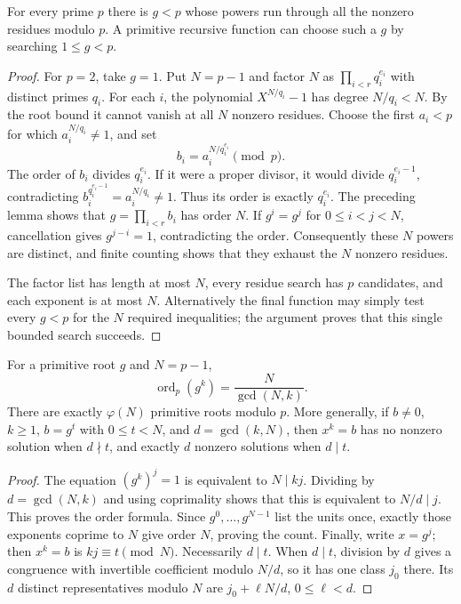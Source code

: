\begin{theorem}\label{qr:primitive}
For every prime $p$ there is $g<p$ whose powers run through all the
nonzero residues modulo $p$. A primitive recursive function can choose
such a $g$ by searching $1\le g<p$.
\end{theorem}
\begin{proof}
For $p=2$, take $g=1$. Put $N=p-1$ and factor $N$ as
$\prod_{i<r}q_i^{e_i}$ with distinct primes $q_i$. For each $i$, the
polynomial $X^{N/q_i}-1$ has degree $N/q_i<N$. By the root bound it
cannot vanish at all $N$ nonzero residues. Choose the first $a_i<p$
for which $a_i^{N/q_i}\ne1$, and set
\[
 b_i=a_i^{N/q_i^{e_i}}\pmod p.
\]
The order of $b_i$ divides $q_i^{e_i}$. If it were a proper divisor,
it would divide $q_i^{e_i-1}$, contradicting
$b_i^{q_i^{e_i-1}}=a_i^{N/q_i}\ne1$. Thus its order is exactly
$q_i^{e_i}$. The preceding lemma shows that $g=\prod_{i<r}b_i$
has order $N$. If $g^i=g^j$ for $0\le i<j<N$, cancellation gives
$g^{j-i}=1$, contradicting the order. Consequently these $N$ powers
are distinct, and finite counting shows that they exhaust the $N$
nonzero residues.

The factor list has length at most $N$, every residue search has $p$
candidates, and each exponent is at most $N$. Alternatively the final
function may simply test every $g<p$ for the $N$ required inequalities;
the argument proves that this single bounded search succeeds.
\end{proof}

\begin{corollary}
\label{qr:primitive-count}
For a primitive root $g$ and $N=p-1$,
\[
 \operatorname{ord}_p(g^k)=\frac{N}{\gcd(N,k)}.
\]
There are exactly $\varphi(N)$ primitive roots modulo $p$. More generally,
if $b\ne0$, $k\ge1$, $b=g^t$ with $0\le t<N$, and $d=\gcd(k,N)$,
then $x^k=b$ has no nonzero solution when $d\nmid t$, and exactly $d$
nonzero solutions when $d\mid t$.
\end{corollary}
\begin{proof}
The equation $(g^k)^j=1$ is equivalent to $N\mid kj$. Dividing by
$d=\gcd(N,k)$ and using coprimality shows that this is equivalent to
$N/d\mid j$. This proves the order formula. Since $g^0,\ldots,g^{N-1}$
list the units once, exactly those exponents coprime to $N$ give order
$N$, proving the count. Finally, write $x=g^j$; then $x^k=b$ is
$kj\equiv t\pmod N$. Necessarily $d\mid t$. When $d\mid t$, division
by $d$ gives a congruence with invertible coefficient modulo $N/d$,
so it has one class $j_0$ there. Its $d$ distinct representatives modulo
$N$ are $j_0+\ell N/d$, $0\le\ell<d$.
\end{proof}


